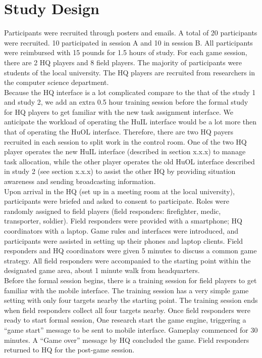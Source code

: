  

\section{Study Design}
Participants were recruited through posters and emails. A total of 20 participants were recruited. 10 participated in session A and 10 in session B. All participants were reimbursed with 15 pounds for 1.5 hours of study. For each game session, there are 2 HQ players and 8 field players. The majority of participants were students of the local university. The HQ players are recruited from researchers in the computer science department. \\

Because the HQ interface is a lot complicated compare to the that of the study 1 and study 2, we add an extra 0.5 hour training session before the formal study for HQ players to get familiar with the new task assignment interface. We anticipate the workload of operating the HuIL interface would be a lot more then that of operating the HuOL interface. Therefore, there are two HQ payers recruited in each session to split work in the control room. One of the two HQ player operates the new HuIL interface (described in section x.x.x) to manage task allocation, while the other player operates the old HuOL interface described in study 2 (see section x.x.x) to assist the other HQ by providing situation awareness and sending broadcasting information. \\

Upon arrival in the HQ (set up in a meeting room at the local university), participants were briefed and asked to consent to participate. Roles were randomly assigned to field players (field responders: firefighter, medic, transporter, soldier). Field responders were provided with a smartphone; HQ coordinators with a laptop. Game rules and interfaces were introduced, and participants were assisted in setting up their phones and laptop clients. Field responders and HQ coordinators were given 5 minutes to discuss a common game strategy. All field responders were accompanied to the starting point within the designated game area, about 1 minute walk from headquarters.\\

Before the formal session begins, there is a training session for field players to get familiar with the mobile interface. The training session has a very simple game setting with only four targets nearby the starting point. The training session ends when field responders collect all four targets nearby. Once field responders were ready to start formal session, One research start the game engine, triggering a ``game start'' message to be sent to mobile interface. Gameplay commenced for 30 minutes. A ``Game over'' message by HQ concluded the game. Field responders returned to HQ for the post-game session.\\

